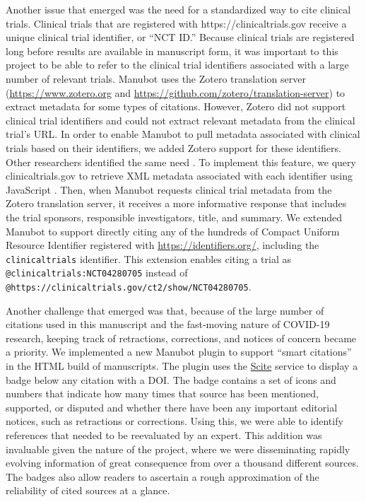 \documentclass[sigconf]{acmart}
\begin{document}
Another issue that emerged was the need for a standardized way to cite clinical trials.
Clinical trials that are registered with https://clinicaltrials.gov receive a unique clinical trial identifier, or ``NCT ID.''
Because clinical trials are registered long before results are available in manuscript form, it was important to this project to be able to refer to the clinical trial identifiers associated with a large number of relevant trials.
Manubot uses the Zotero translation server (\url{https://www.zotero.org} and \url{https://github.com/zotero/translation-server}) to extract metadata for some types of citations.
However, Zotero did not support clinical trial identifiers and could not extract relevant metadata from the clinical trial's URL.
In order to enable Manubot to pull metadata associated with clinical trials based on their identifiers, we added Zotero support for these identifiers.
Other researchers identified the same need \citep{ZQPtEdnO, thdq2nGf}.
To implement this feature, we query clinicaltrials.gov to retrieve XML metadata associated with each identifier using JavaScript \citep{Bxfd7L4s}.
Then, when Manubot requests clinical trial metadata from the Zotero translation server, it receives a more informative response that includes the trial sponsors, responsible investigators, title, and summary.
We extended Manubot to support directly citing any of the hundreds of Compact Uniform Resource Identifier registered with \url{https://identifiers.org/}, including the \texttt{clinicaltrials} identifier.
This extension enables citing a trial as \texttt{@clinicaltrials:NCT04280705} instead of \texttt{@https://clinicaltrials.gov/ct2/show/NCT04280705}.

Another challenge that emerged was that, because of the large number of citations used in this manuscript and the fast-moving nature of COVID-19 research, keeping track of retractions, corrections, and notices of concern became a priority.
We implemented a new Manubot plugin to support ``smart citations'' in the HTML build of manuscripts.
The plugin uses the \href{https://scite.ai/}{Scite} \citep{14UJbLWf4} service to display a badge below any citation with a DOI.
The badge contains a set of icons and numbers that indicate how many times that source has been mentioned, supported, or disputed and whether there have been any important editorial notices, such as retractions or corrections.
Using this, we were able to identify references that needed to be reevaluated by an expert.
This addition was invaluable given the nature of the project, where we were disseminating rapidly evolving information of great consequence from over a thousand different sources.
The badges also allow readers to ascertain a rough approximation of the reliability of cited sources at a glance.
\end{document}
